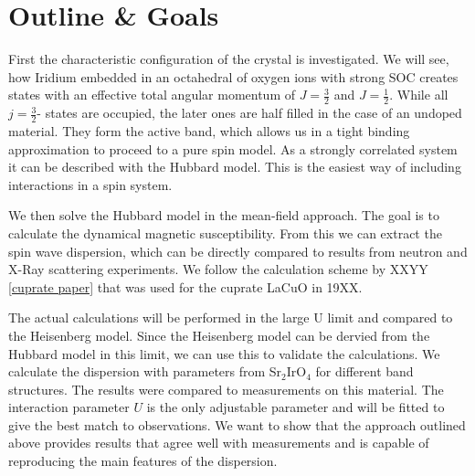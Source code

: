 \documentclass[a4paper,10pt]{report}
\begin{document}





\section{Outline \& Goals}

First the characteristic configuration of the crystal is  investigated.
We will see, how Iridium embedded in an octahedral of oxygen ions  with strong  SOC
creates states with an effective total angular momentum of $J=\frac32$ and $J=\frac12$.
While all $j=\frac32$- states are occupied, the later ones are half filled in the case of an undoped material.
They form the active band, which allows us in a tight binding approximation to proceed to a pure spin model. 
As a strongly correlated system it can be described with the Hubbard model. 
This is the easiest way of including interactions in a spin system.


We then solve the Hubbard model in the mean-field approach.
The goal is to calculate the dynamical magnetic susceptibility.
From this we can extract the spin wave dispersion, which 
can be directly compared to results from neutron and X-Ray scattering experiments.
We follow the calculation scheme by XXYY \ref{cuprate paper} that was used for the cuprate LaCuO in 19XX.

The actual calculations will be performed in the large U limit and compared to the Heisenberg model.
Since the Heisenberg model can be dervied from the Hubbard model in this limit, we can use this to validate the calculations.
We calculate the dispersion with parameters from Sr$_2$IrO$_4$ for different band structures.
The results were compared to measurements on this material. 
The interaction parameter $U$ is the only adjustable parameter and will be fitted to give the best match to observations.
We want to show that the approach outlined above provides results that agree well with measurements and is capable of reproducing the main features of the dispersion. 
%
\end{document}
